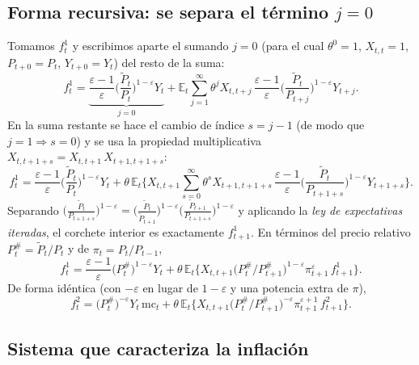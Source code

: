\documentclass[11pt]{article}
\theoremstyle{definition}
\newcommand{\E}{\mathbb{E}}
\newcommand{\mc}{\mathrm{mc}}
\begin{document}
\subsection{Forma recursiva: se separa el término \texorpdfstring{$j=0$}{j=0}}

Tomamos $f^{1}_{t}$ y escribimos aparte el sumando $j=0$ (para el cual $\theta^{0}=1$, $X_{t,t}=1$,
$P_{t+0}=P_{t}$, $Y_{t+0}=Y_{t}$) del resto de la suma:
\begin{equation}
f^{1}_{t}=\underbrace{\frac{\varepsilon-1}{\varepsilon}\Big(\frac{\widetilde{P}_{t}}{P_{t}}\Big)^{1-\varepsilon}Y_{t}}_{j=0}
+\E_{t}\sum_{j=1}^{\infty}\theta^{j}X_{t,t+j}\,\frac{\varepsilon-1}{\varepsilon}\Big(\frac{\widetilde{P}_{t}}{P_{t+j}}\Big)^{1-\varepsilon}Y_{t+j}.
\end{equation}
En la suma restante se hace el cambio de índice $s=j-1$ (de modo que $j=1\Rightarrow s=0$) y se usa la
propiedad multiplicativa $X_{t,t+1+s}=X_{t,t+1}\,X_{t+1,t+1+s}$:
\begin{equation}
f^{1}_{t}=\frac{\varepsilon-1}{\varepsilon}\Big(\frac{\widetilde{P}_{t}}{P_{t}}\Big)^{1-\varepsilon}Y_{t}
+\theta\,\E_{t}\Big\{X_{t,t+1}\!\sum_{s=0}^{\infty}\theta^{s}X_{t+1,t+1+s}\,\frac{\varepsilon-1}{\varepsilon}\Big(\frac{\widetilde{P}_{t}}{P_{t+1+s}}\Big)^{1-\varepsilon}Y_{t+1+s}\Big\}.
\end{equation}
Separando $\big(\tfrac{\widetilde{P}_{t}}{P_{t+1+s}}\big)^{1-\varepsilon}
=\big(\tfrac{\widetilde{P}_{t}}{\widetilde{P}_{t+1}}\big)^{1-\varepsilon}\big(\tfrac{\widetilde{P}_{t+1}}{P_{t+1+s}}\big)^{1-\varepsilon}$
y aplicando la \emph{ley de expectativas iteradas}, el corchete interior es exactamente $f^{1}_{t+1}$.
En términos del precio relativo $P_{t}^{\#}=\widetilde{P}_{t}/P_{t}$ y de $\pi_{t}=P_{t}/P_{t-1}$,
\begin{equation}
f^{1}_{t}=\frac{\varepsilon-1}{\varepsilon}\big(P_{t}^{\#}\big)^{1-\varepsilon}Y_{t}
+\theta\,\E_{t}\Big\{X_{t,t+1}\big(P_{t}^{\#}/P_{t+1}^{\#}\big)^{1-\varepsilon}\pi_{t+1}^{\varepsilon}\,f^{1}_{t+1}\Big\}.
\end{equation}
De forma idéntica (con $-\varepsilon$ en lugar de $1-\varepsilon$ y una potencia extra de $\pi$),
\begin{equation}
f^{2}_{t}=\big(P_{t}^{\#}\big)^{-\varepsilon}Y_{t}\,\mc_{t}
+\theta\,\E_{t}\Big\{X_{t,t+1}\big(P_{t}^{\#}/P_{t+1}^{\#}\big)^{-\varepsilon}\pi_{t+1}^{\varepsilon+1}\,f^{2}_{t+1}\Big\}.
\end{equation}

\subsection{Sistema que caracteriza la inflación}
\end{document}
